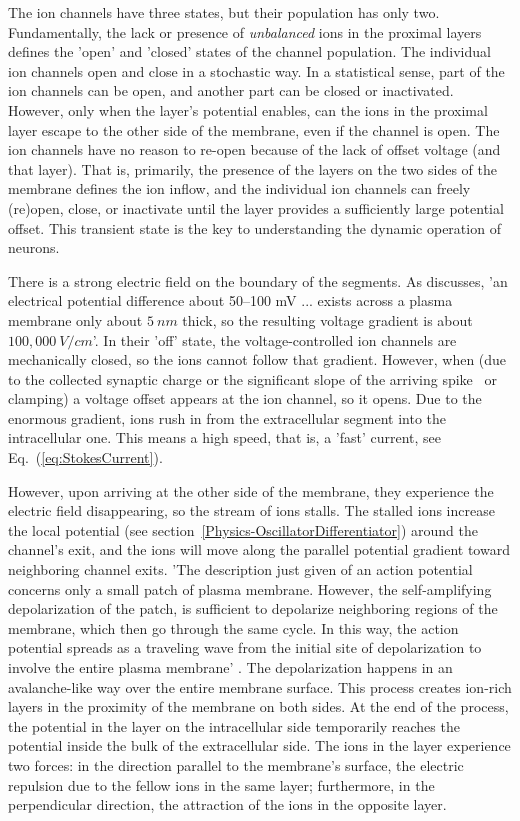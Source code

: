 The ion channels have three states, but their population has only two.
Fundamentally, the lack or presence of \textit{unbalanced} ions in the proximal layers defines the 'open' and 'closed' states of the channel population. The individual
ion channels open and close in a stochastic way. In a statistical sense, part of the ion channels can be open, and another part can be closed or inactivated.
However, only when the layer's potential enables, can the ions in the proximal layer
escape to the other side of the membrane, even if the channel is open. 
The ion channels have no reason to re-open because of the lack of offset voltage (and that layer).
That is, primarily, the presence of the layers on the two sides of the membrane defines the ion inflow,
and the individual ion channels  can freely (re)open, close, or inactivate
until the layer provides a sufficiently large potential offset.
This transient state is the key to understanding the dynamic operation of neurons.

There is a strong electric field on the boundary of the segments. 
As \cite{MolecularBiology:2002} discusses,  'an electrical potential difference about 50–100 mV ... exists across a plasma membrane only about $5\ nm$ thick, so the resulting voltage gradient is about $100,000\ V/cm$'. 
In their 'off' state, the voltage-controlled ion channels are mechanically closed, so the ions cannot follow that gradient.  
However, when (due to the collected synaptic charge or the significant slope of the arriving spike~\cite{LosonczyIntegrative:2006} or clamping) a voltage offset appears at the  ion channel, so it opens. Due to the enormous gradient, ions rush in
from the extracellular segment into the intracellular one. This means a high speed, that is, a 'fast' current, see Eq.~(\ref{eq:StokesCurrent}).

However, upon arriving at the other side of the  membrane, they experience the
electric field disappearing, so the stream of ions stalls. The stalled ions 
increase the local potential (see section~\ref{Physics-OscillatorDifferentiator}) around the  channel's exit,
and the ions will move along the parallel potential gradient toward neighboring 
channel exits. 
'The description just given of an action potential concerns only a small patch of plasma membrane.
However, the self-amplifying depolarization of the patch, 
is sufficient to depolarize neighboring regions of the membrane,
which then go through the same cycle. In this way,
the action potential spreads as a traveling wave from the initial site of depolarization
to involve the entire plasma membrane' \cite{MolecularBiology:2002}.
The depolarization happens in an avalanche-like way \cite{NeuronalAvalanches:2003} over the entire membrane surface.  
This process creates ion-rich layers in the proximity of the membrane
on both sides. At the end of the process, the potential in the layer on the intracellular side temporarily reaches
the  potential inside the bulk of the extracellular side.
The ions in the layer experience two forces: in the direction 
parallel to the membrane's surface, the electric repulsion due to the fellow ions in the same layer; furthermore, in the perpendicular direction, the attraction of the ions
in the opposite layer.

